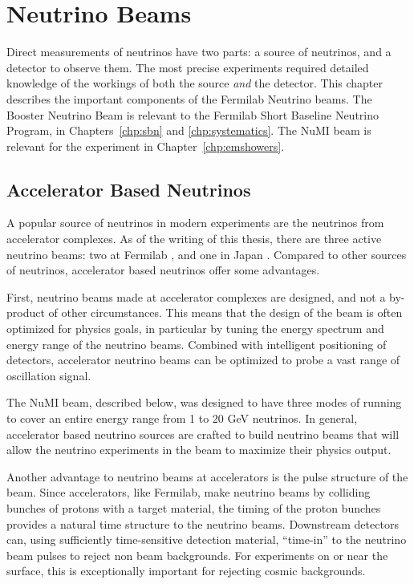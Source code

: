 \chapter{\label{chp:beams} Neutrino Beams}

Direct measurements of neutrinos have two parts: a source of neutrinos, and a detector to observe them.  The most precise experiments required detailed knowledge of the workings of both the source {\em and} the detector.  This chapter describes the important components of the Fermilab Neutrino beams.  The Booster Neutrino Beam is relevant to the Fermilab Short Baseline Neutrino Program, in Chapters~\ref{chp:sbn} and \ref{chp:systematics}.  The NuMI beam is relevant for the \argoneut experiment in Chapter~\ref{chp:emshowers}. 

\section{Accelerator Based Neutrinos}

A popular source of neutrinos in modern experiments are the neutrinos from accelerator complexes.  As of the writing of this thesis, there are three active neutrino beams: two at Fermilab \cite{Adamson:2015dkw, AguilarArevalo:2008yp}, and one in Japan \cite{Abe:2014oxa}.  Compared to other sources of neutrinos, accelerator based neutrinos offer some advantages.

First, neutrino beams made at accelerator complexes are designed, and not a by-product of other circumstances.  This means that the design of the beam is often optimized for physics goals, in particular by tuning the energy spectrum and energy range of the neutrino beams.  Combined with intelligent positioning of detectors, accelerator neutrino beams can be optimized to probe a vast range of oscillation signal.

The NuMI beam, described below, was designed to have three modes of running to cover an entire energy range from 1 to 20 GeV neutrinos.  In general, accelerator based neutrino sources are crafted to build neutrino beams that will allow the neutrino experiments in the beam to maximize their physics output.

Another advantage to neutrino beams at accelerators is the pulse structure of the beam.  Since accelerators, like Fermilab, make neutrino beams by colliding bunches of protons with a target material, the timing of the proton bunches provides a natural time structure to the neutrino beams.  Downstream detectors can, using sufficiently time-sensitive detection material, ``time-in'' to the neutrino beam pulses to reject non beam backgrounds.  For experiments on or near the surface, this is exceptionally important for rejecting cosmic backgrounds.

